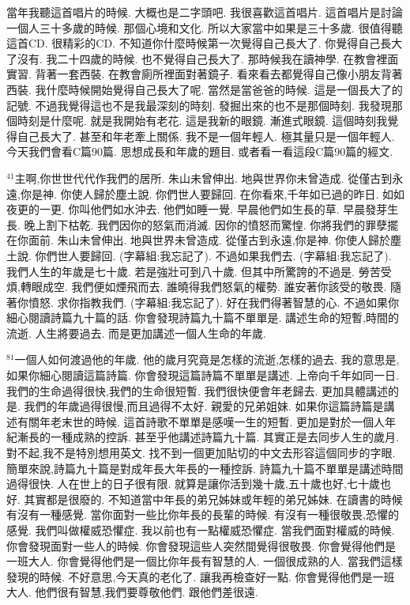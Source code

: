 \documentclass{book}
\begin{document}
當年我聽這首唱片的時候.
大概也是二字頭吧.
我很喜歡這首唱片.
這首唱片是討論一個人三十多歲的時候.
那個心境和文化.
所以大家當中如果是三十多歲.
很值得聽這首CD.
很精彩的CD.
不知道你什麼時候第一次覺得自己長大了.
你覺得自己長大了沒有.
我二十四歲的時候.
也不覺得自己長大了.
那時候我在讀神學.
在教會裡面實習.
背著一套西裝.
在教會廁所裡面對著鏡子.
看來看去都覺得自己像小朋友背著西裝.
我什麼時候開始覺得自己長大了呢.
當然是當爸爸的時候.
這是一個長大了的記號.
不過我覺得這也不是我最深刻的時刻.
發掘出來的也不是那個時刻.
我發現那個時刻是什麼呢.
就是我開始有老花.
這是我新的眼鏡.
漸進式眼鏡.
這個時刻我覺得自己長大了.
甚至和年老牽上關係.
我不是一個年輕人.
極其量只是一個年輕人.
今天我們會看C篇90篇.
思想成長和年歲的題目.
或者看一看這段C篇90篇的經文.

$^{41}$主啊,你世世代代作我們的居所.
朱山未曾伸出.
地與世界你未曾造成.
從僅古到永遠,你是神.
你使人歸於塵土說.
你們世人要歸回.
在你看來,千年如已過的昨日.
如如夜更的一更.
你叫他們如水沖去.
他們如睡一覺.
早晨他們如生長的草.
早晨發芽生長.
晚上割下枯乾.
我們因你的怒氣而消滅.
因你的憤怒而驚惶.
你將我們的罪孽擺在你面前.
朱山未曾伸出.
地與世界未曾造成.
從僅古到永遠,你是神.
你使人歸於塵土說.
你們世人要歸回.
(字幕組:我忘記了).
不過如果我們去.
(字幕組:我忘記了).
我們人生的年歲是七十歲.
若是強壯可到八十歲.
但其中所驚誇的不過是.
勞苦受煩,轉眼成空.
我們便如煙飛而去.
誰曉得我們怒氣的權勢.
誰安著你該受的敬畏.
隨著你憤怒.
求你指教我們.
(字幕組:我忘記了).
好在我們得著智慧的心.
不過如果你細心閱讀詩篇九十篇的話.
你會發現詩篇九十篇不單單是.
講述生命的短暫,時間的流逝.
人生將要過去.
而是更加講述一個人生命的年歲.

$^{81}$一個人如何渡過他的年歲.
他的歲月究竟是怎樣的流逝,怎樣的過去.
我的意思是,如果你細心閱讀這篇詩篇.
你會發現這篇詩篇不單單是講述.
上帝向千年如同一日.
我們的生命過得很快,我們的生命很短暫.
我們很快便會年老歸去.
更加具體講述的是.
我們的年歲過得很慢,而且過得不太好.
親愛的兄弟姐妹.
如果你這篇詩篇是講述有關年老末世的時候.
這首詩歌不單單是感嘆一生的短暫.
更加是對於一個人年紀漸長的一種成熟的控訴.
甚至乎他講述詩篇九十篇.
其實正是去同步人生的歲月.
對不起,我不是特別想用英文.
找不到一個更加貼切的中文去形容這個同步的字眼.
簡單來說,詩篇九十篇是對成年長大年長的一種控訴.
詩篇九十篇不單單是講述時間過得很快.
人在世上的日子很有限.
就算是讓你活到幾十歲,五十歲也好,七十歲也好.
其實都是很廢的.
不知道當中年長的弟兄姊妹或年輕的弟兄姊妹.
在讀書的時候有沒有一種感覺.
當你面對一些比你年長的長輩的時候.
有沒有一種很敬畏,恐懼的感覺.
我們叫做權威恐懼症.
我以前也有一點權威恐懼症.
當我們面對權威的時候.
你會發現面對一些人的時候.
你會發現這些人突然間覺得很敬畏.
你會覺得他們是一班大人.
你會覺得他們是一個比你年長有智慧的人.
一個很成熟的人.
當我們這樣發現的時候.
不好意思,今天真的老化了.
讓我再檢查好一點.
你會覺得他們是一班大人.
他們很有智慧,我們要尊敬他們.
跟他們差很遠.
\end{document}
